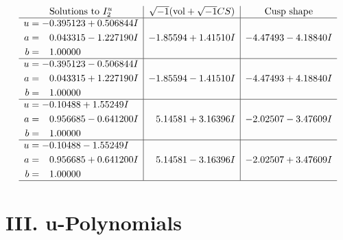 \documentclass[1p]{elsarticle_modified}
\theoremstyle{definition}
\newcommand{\I}{\sqrt{-1}}
\begin{document}
$$\begin{array}{c|c|c}  
\text{Solutions to }I^u_{2}& \I (\text{vol} + \sqrt{-1}CS) & \text{Cusp shape}\\
 \hline 
\begin{aligned}
u &= -0.395123 + 0.506844 I \\
a &= \phantom{-}0.043315 - 1.227190 I \\
b &= \phantom{-}1.00000\phantom{ +0.000000I}\end{aligned}
 & -1.85594 + 1.41510 I & -4.47493 - 4.18840 I \\ \hline\begin{aligned}
u &= -0.395123 - 0.506844 I \\
a &= \phantom{-}0.043315 + 1.227190 I \\
b &= \phantom{-}1.00000\phantom{ +0.000000I}\end{aligned}
 & -1.85594 - 1.41510 I & -4.47493 + 4.18840 I \\ \hline\begin{aligned}
u &= -0.10488 + 1.55249 I \\
a &= \phantom{-}0.956685 - 0.641200 I \\
b &= \phantom{-}1.00000\phantom{ +0.000000I}\end{aligned}
 & \phantom{-}5.14581 + 3.16396 I & -2.02507 - 3.47609 I \\ \hline\begin{aligned}
u &= -0.10488 - 1.55249 I \\
a &= \phantom{-}0.956685 + 0.641200 I \\
b &= \phantom{-}1.00000\phantom{ +0.000000I}\end{aligned}
 & \phantom{-}5.14581 - 3.16396 I & -2.02507 + 3.47609 I\\
 \hline 
 \end{array}$$\newpage
\newpage\renewcommand{\arraystretch}{1}
\centering \section*{ III. u-Polynomials}
\end{document}
